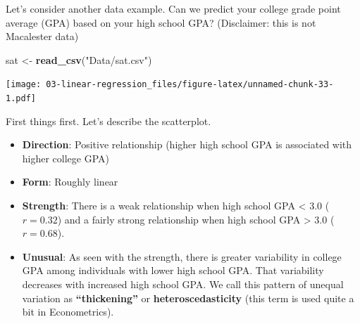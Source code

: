 \documentclass[
]{book}
\newenvironment{Shaded}{\begin{snugshade}}{\end{snugshade}}
\newcommand{\DataTypeTok}[1]{\textcolor[rgb]{0.13,0.29,0.53}{#1}}
\newcommand{\KeywordTok}[1]{\textcolor[rgb]{0.13,0.29,0.53}{\textbf{#1}}}
\newcommand{\NormalTok}[1]{#1}
\newcommand{\OperatorTok}[1]{\textcolor[rgb]{0.81,0.36,0.00}{\textbf{#1}}}
\newcommand{\OtherTok}[1]{\textcolor[rgb]{0.56,0.35,0.01}{#1}}
\newcommand{\StringTok}[1]{\textcolor[rgb]{0.31,0.60,0.02}{#1}}
\providecommand{\tightlist}{%
  \setlength{\itemsep}{0pt}\setlength{\parskip}{0pt}}
\begin{document}
Let's consider another data example. Can we predict your college grade point average (GPA) based on your high school GPA? (Disclaimer: this is not Macalester data)

\begin{Shaded}
\begin{Highlighting}[]
\NormalTok{sat <-}\StringTok{ }\KeywordTok{read_csv}\NormalTok{(}\StringTok{"Data/sat.csv"}\NormalTok{)}
\end{Highlighting}
\end{Shaded}

\begin{Shaded}
\end{Shaded}

\texttt{[image: 03-linear-regression\_files/figure-latex/unnamed-chunk-33-1.pdf]}

First things first. Let's describe the scatterplot.

\begin{itemize}
\tightlist
\item
  \textbf{Direction}: Positive relationship (higher high school GPA is associated with higher college GPA)
\item
  \textbf{Form}: Roughly linear
\item
  \textbf{Strength}: There is a weak relationship when high school GPA \textless{} 3.0 (\(r = 0.32\)) and a fairly strong relationship when high school GPA \textgreater{} 3.0 (\(r = 0.68\)).
\item
  \textbf{Unusual}: As seen with the strength, there is greater variability in college GPA among individuals with lower high school GPA. That variability decreases with increased high school GPA. We call this pattern of unequal variation as \textbf{``thickening''} or \textbf{heteroscedasticity} (this term is used quite a bit in Econometrics).
\end{itemize}
\end{document}
